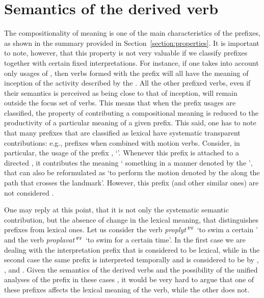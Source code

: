 \section{Semantics of the derived verb}\label{section:new:compositionality}
The compositionality of meaning is one of the main characteristics of the  prefixes, as shown in the summary provided in Section~\ref{section:properties}. It is important to note, however, that this property is not very valuable if we classify prefixes together with certain fixed interpretations. For instance, if one takes into account only  usages of , then verbs formed with the  prefix  will all have the meaning of inception of the activity described by the . All the other prefixed verbs, even if their semantics is perceived as being close to that of inception, will remain outside the focus set of verbs. This means that when the prefix usages are classified, the property of contributing a compositional meaning is reduced to the productivity of a particular meaning of a given prefix. This said, one has to note that many prefixes that are classified as lexical have systematic transparent contributions: e.g.,  prefixes when combined with motion verbs. Consider, in particular, the  usage of the prefix , `'. Whenever this prefix is attached to a directed , it contributes the meaning ` something in a manner denoted by the ', that can also be reformulated as `to perform the motion denoted by the  along the path that crosses the landmark'. However, this prefix (and other similar ones) are not considered .

One may reply at this point, that it is not only the systematic semantic contribution, but the absence of change in the lexical meaning, that distinguishes  prefixes from lexical ones. Let us consider the verb \textit{proplyt'}$^{\textsc{pf}}$ `to swim a certain ' and the verb \textit{proplavat'}$^{\textsc{pf}}$ `to swim for a certain time'. In the first case we are dealing with the  interpretation prefix  that is considered to be lexical, while in the second case the same prefix is interpreted temporally and is considered to be  by \citet{Babko-Malaya:99}, \citet{Svenonius:04a}, and \citet{Svenonius:12}. Given the semantics of the derived verbs and the possibility of the unified analyses of the prefix  in these cases \citep{Kagan:book, ZinovaOsswald:paper}, it would be very hard to argue that one of these prefixes affects the lexical meaning of the verb, while the other does not. 

